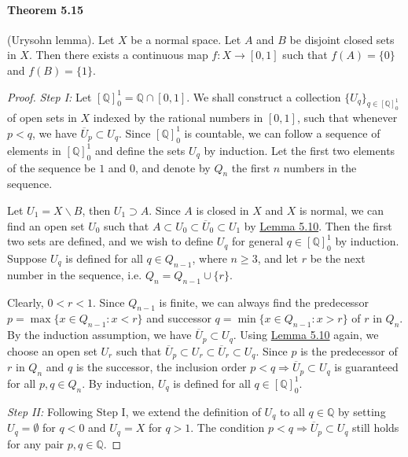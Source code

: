 \documentclass{article}
\numberwithin{equation}{section}
\theoremstyle{plain}
\theoremstyle{definition}
\begin{document}
\paragraph{Theorem 5.15} (Urysohn lemma). Let $X$ be a normal space. Let $A$ and $B$ be disjoint closed sets in $X$. Then there exists a continuous map $f:X\to [0,1]$ such that $f(A)=\{0\}$ and $f(B)=\{1\}$.
\begin{proof}
\textit{Step I:} Let $[\mathbb{Q}]_0^1=\mathbb{Q}\cap[0,1]$. We shall construct a collection $\{U_q\}_{q\in [\mathbb{Q}]_0^1}$ of open sets in $X$ indexed by the rational numbers in $[0,1]$, such that whenever $p < q$, we have $\overline{U}_p\subset U_q$. Since $[\mathbb{Q}]_0^1$ is countable, we can follow a sequence of elements in $[\mathbb{Q}]_0^1$ and define the sets $U_q$ by induction. Let the first two elements of the sequence be $1$ and $0$, and denote by $Q_n$ the first $n$ numbers in the sequence.

Let $U_1=X\backslash B$, then $U_1\supset A$. Since $A$ is closed in $X$ and $X$ is normal, we can find an open set $U_0$ such that $A\subset U_0\subset\overline{U}_0\subset U_1$ by \hyperref[lemma:5.10]{Lemma 5.10}. Then the first two sets are defined, and we wish to define $U_q$ for general $q\in[\mathbb{Q}]_0^1$ by induction. Suppose $U_{q}$ is defined for all $q\in Q_{n-1}$, where $n\geq 3$, and let $r$ be the next number in the sequence, i.e. $Q_n = Q_{n-1}\cup\{r\}$. 

Clearly, $0<r<1$. Since $Q_{n-1}$ is finite, we can always find the predecessor $p=\max\{x\in Q_{n-1}:x<r\}$ and successor $q=\min\{x\in Q_{n-1}:x>r\}$ of $r$ in $Q_n$. By the induction assumption, we have $\overline{U}_p\subset U_q$. Using \hyperref[lemma:5.10]{Lemma 5.10} again, we choose an open set $U_r$ such that $\overline{U}_p\subset U_r\subset\overline{U}_r\subset U_q$. Since $p$ is the predecessor of $r$ in $Q_n$ and $q$ is the successor, the inclusion order $p<q\Rightarrow\overline{U}_p\subset U_q$ is guaranteed for all $p,q\in Q_n$. By induction, $U_q$ is defined for all $q\in[\mathbb{Q}]_0^1$.
\vspace{0.12cm}

\textit{Step II:} Following Step I, we extend the definition of $U_q$ to all $q\in\mathbb{Q}$ by setting $U_q = \emptyset$ for $q < 0$ and $U_q = X$ for $q > 1$. The condition $p<q\Rightarrow \overline{U}_p\subset U_q$ still holds for any pair $p,q\in\mathbb{Q}$.
\vspace{0.12cm}


\end{proof}
\end{document}
